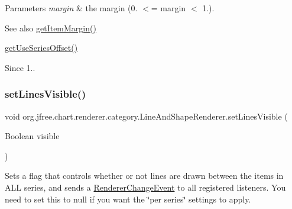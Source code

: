 \begin{DoxyParams}{Parameters}
{\em margin} & the margin (0. $<$= margin $<$ 1.).\\
\hline
\end{DoxyParams}
\begin{DoxySeeAlso}{See also}
\mbox{\hyperlink{classorg_1_1jfree_1_1chart_1_1renderer_1_1category_1_1_line_and_shape_renderer_af16e29caa6c86f32b5bb286b2ddefa3f}{get\+Item\+Margin()}} 

\mbox{\hyperlink{classorg_1_1jfree_1_1chart_1_1renderer_1_1category_1_1_line_and_shape_renderer_a5966e51f1ff8a604e9ec08c9700ed5ad}{get\+Use\+Series\+Offset()}}
\end{DoxySeeAlso}
\begin{DoxySince}{Since}
1.. 
\end{DoxySince}
\mbox{\label{classorg_1_1jfree_1_1chart_1_1renderer_1_1category_1_1_line_and_shape_renderer_ac17bb2a4b2553880625859d5f09c88e4}} 
\subsubsection{\texorpdfstring{set\+Lines\+Visible()}{setLinesVisible()}\hspace{0.1cm}{\footnotesize\ttfamily [1/2]}}
{\footnotesize\ttfamily void org.\+jfree.\+chart.\+renderer.\+category.\+Line\+And\+Shape\+Renderer.\+set\+Lines\+Visible (\begin{DoxyParamCaption}\item[{Boolean}]{visible }\end{DoxyParamCaption})}

Sets a flag that controls whether or not lines are drawn between the items in A\+LL series, and sends a \mbox{\hyperlink{}{Renderer\+Change\+Event}} to all registered listeners. You need to set this to {\ttfamily null} if you want the \char`\"{}per series\char`\"{} settings to apply.


